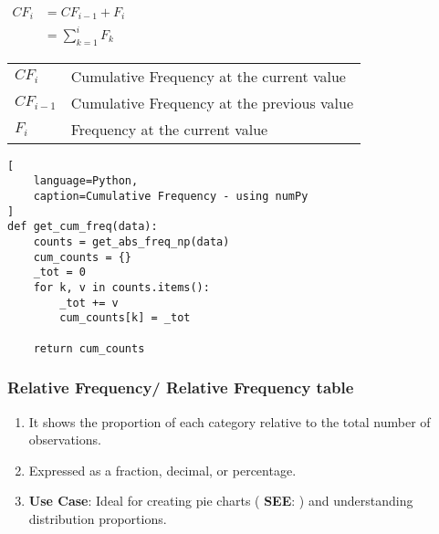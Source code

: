 \begin{table}[H]
    \begin{minipage}[H]{0.3\linewidth}
    $
        \begin{aligned}
            CF_i 
                &= CF_{i-1} + F_{i} \\
                &= \sum_{k=1}^{i} F_{k}
        \end{aligned}
    $
    \end{minipage}
    \begin{minipage}[H]{0.65\linewidth}
        \begin{table}[H]
            \begin{tabular}{l l}
                $CF_i$ & Cumulative Frequency at the current value \\ 
                $CF_{i-1}$ & Cumulative Frequency at the previous value \\ 
                $F_i$ & Frequency at the current value \\ 
            \end{tabular}
        \end{table}
    \end{minipage}
\end{table}

\begin{lstlisting}[
    language=Python, 
    caption=Cumulative Frequency - using numPy
]
def get_cum_freq(data):
    counts = get_abs_freq_np(data)
    cum_counts = {}
    _tot = 0
    for k, v in counts.items():
        _tot += v
        cum_counts[k] = _tot
    
    return cum_counts
\end{lstlisting}


\subsubsection{Relative Frequency/ Relative Frequency table \cite{statistics/book/Statistics-for-Data-Scientists/Maurits-Kaptein}}\label{Data/Describing Data/Frequency or Frequency table/Relative}

\begin{enumerate}
    \item It shows the proportion of each category relative to the total number of observations. \hfill \cite{common/online/chatgpt}

    \item Expressed as a fraction, decimal, or percentage. \hfill \cite{common/online/chatgpt}

    \item \textbf{Use Case}: Ideal for creating pie charts ( \textbf{SEE}:  ) and understanding distribution proportions. \hfill \cite{common/online/chatgpt}
\end{enumerate}


